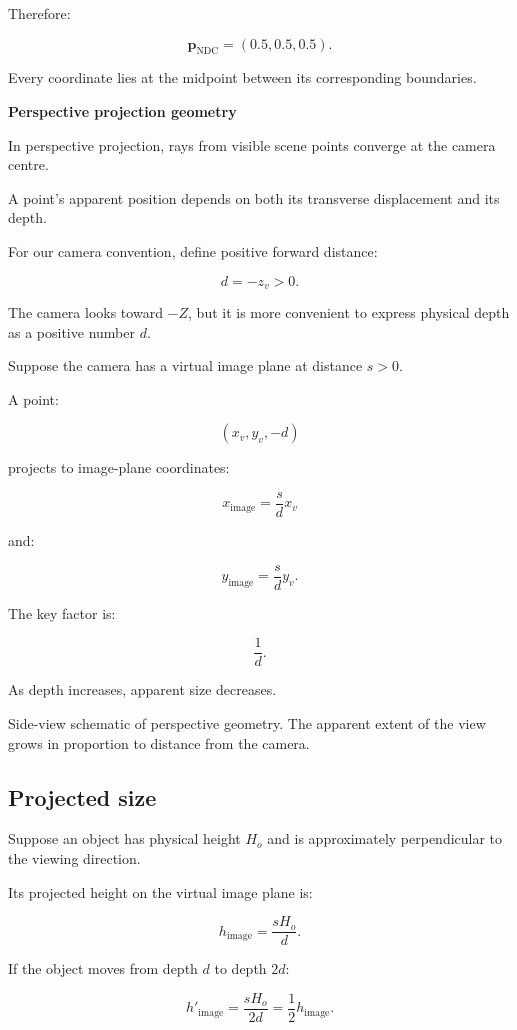 Therefore:

\[
 \boxed{ \mathbf p_{\mathrm{NDC}}=(0.5,0.5,0.5) }.
\]

Every coordinate lies at the midpoint between its corresponding boundaries.

\textbf{Perspective projection geometry}

In perspective projection, rays from visible scene points converge at the camera centre.

A point's apparent position depends on both its transverse displacement and its depth.

For our camera convention, define positive forward distance:

\[
 \boxed{d=-z_v>0}.
\]

The camera looks toward \(-Z\), but it is more convenient to express physical depth as a positive number \(d\).

Suppose the camera has a virtual image plane at distance \(s>0\).

A point:

\[
 (x_v,y_v,-d)
\]

projects to image-plane coordinates:

\[
 \boxed{ x_{\mathrm{image}}=\frac{s}{d}x_v }
\]

and:

\[
 \boxed{ y_{\mathrm{image}}=\frac{s}{d}y_v }.
\]

The key factor is:

\[
 \frac1d.
\]

As depth increases, apparent size decreases.

Side-view schematic of perspective geometry. The apparent extent of the view grows in proportion to distance from the camera.

\subsection{Projected size}\label{02-foundations-ii-ch033-projected-size}

Suppose an object has physical height \(H_o\) and is approximately perpendicular to the viewing direction.

Its projected height on the virtual image plane is:

\[
 \boxed{ h_{\mathrm{image}}=\frac{sH_o}{d} }.
\]

If the object moves from depth \(d\) to depth \(2d\):

\[
 h'_{\mathrm{image}} = \frac{sH_o}{2d} = \frac12h_{\mathrm{image}}.
\]

